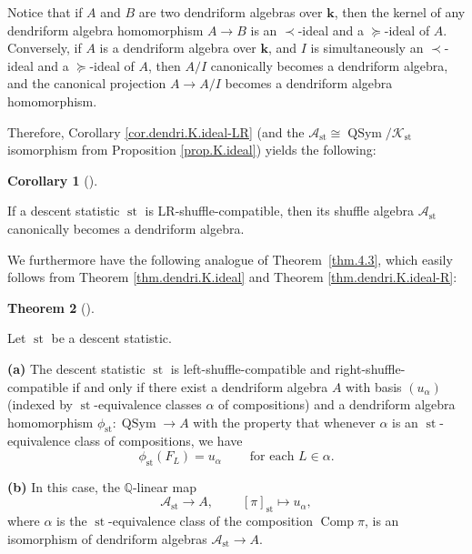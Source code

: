 \documentclass[numbers=enddot,12pt,final,onecolumn,notitlepage]{scrartcl}%
\theoremstyle{definition}
\newtheorem{theo}{Theorem}[section]
\newenvironment{theorem}[1][]
{\begin{theo}[#1]\begin{leftbar}}
{\end{leftbar}\end{theo}}
\newtheorem{coro}[theo]{Corollary}
\newenvironment{corollary}[1][]
{\begin{coro}[#1]\begin{leftbar}}
{\end{leftbar}\end{coro}}
\newenvironment{vershort}{}{}
\begin{document}
\begin{vershort}
Notice that if $A$ and $B$ are two dendriform algebras over $\mathbf{k}$, then
the kernel of any dendriform algebra homomorphism $A\rightarrow B$ is an
$\left.  \prec\right.  $-ideal and a $\left.  \succeq\right.  $-ideal of $A$.
Conversely, if $A$ is a dendriform algebra over $\mathbf{k}$, and $I$ is
simultaneously an $\left.  \prec\right.  $-ideal and a $\left.  \succeq
\right.  $-ideal of $A$, then $A/I$ canonically becomes a dendriform algebra,
and the canonical projection $A\rightarrow A/I$ becomes a dendriform algebra homomorphism.

Therefore, Corollary \ref{cor.dendri.K.ideal-LR} (and the $\mathcal{A}%
_{\operatorname*{st}}\cong\operatorname*{QSym}/\mathcal{K}_{\operatorname*{st}%
}$ isomorphism from Proposition \ref{prop.K.ideal}) yields the following:

\begin{corollary}
If a descent statistic $\operatorname*{st}$ is LR-shuffle-compatible, then its
shuffle algebra $\mathcal{A}_{\operatorname*{st}}$ canonically becomes a
dendriform algebra.
\end{corollary}

We furthermore have the following analogue of Theorem~\ref{thm.4.3}, which
easily follows from Theorem \ref{thm.dendri.K.ideal} and Theorem
\ref{thm.dendri.K.ideal-R}:

\begin{theorem}
\label{thm.dendri.4.3}Let $\operatorname*{st}$ be a descent statistic.

\textbf{(a)} The descent statistic $\operatorname*{st}$ is
left-shuffle-compatible and right-shuffle-compatible if and only if there
exist a dendriform algebra $A$ with
basis $\left(  u_{\alpha}\right)  $ (indexed by $\operatorname*{st}%
$-equivalence classes $\alpha$ of compositions)
and a dendriform algebra homomorphism
$\phi_{\operatorname*{st}}:\operatorname*{QSym} \rightarrow A$
with the property that whenever $\alpha$ is an
$\operatorname{st}$-equivalence class of compositions, we have
\[
\phi_{\operatorname*{st}}\left(  F_{L}\right)  =u_{\alpha}%
\ \ \ \ \ \ \ \ \ \ \text{for each }L\in\alpha.
\]

\textbf{(b)} In this case, the $\mathbb{Q}$-linear map%
\[
\mathcal{A}_{\operatorname*{st}}\rightarrow A,\ \ \ \ \ \ \ \ \ \ \left[
\pi\right]  _{\operatorname*{st}}\mapsto u_{\alpha},
\]
where $\alpha$ is the $\operatorname*{st}$-equivalence class of the
composition $\operatorname*{Comp}\pi$, is an isomorphism of dendriform
algebras $\mathcal{A}_{\operatorname*{st}}\rightarrow A$.
\end{theorem}


\end{vershort}
\end{document}
